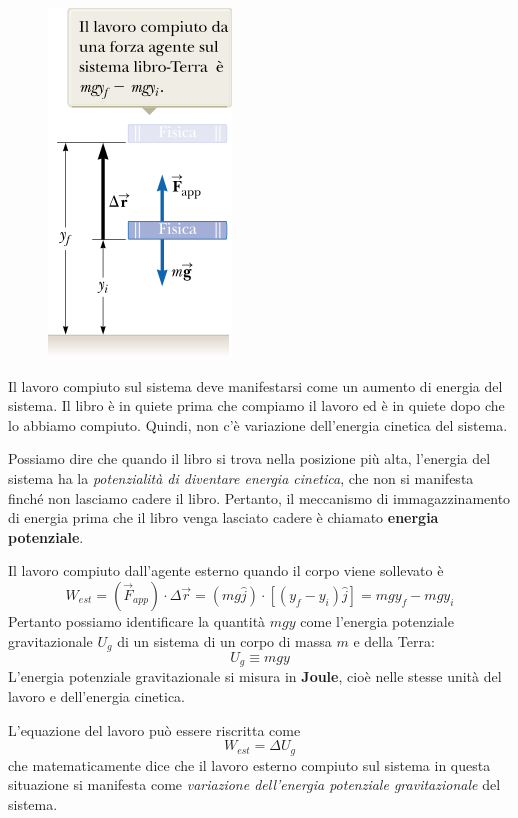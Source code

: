 \documentclass[a4paper,11pt,oneside]{book}
\begin{document}
\begin{figure}[h]
    \centering
    \includegraphics[scale=0.4]{energia_potenziale_schema.png}
\end{figure}
Il lavoro compiuto sul sistema deve manifestarsi come un aumento di energia del sistema. Il libro è in quiete prima che compiamo il lavoro ed è in quiete dopo che lo abbiamo compiuto. Quindi, non c’è variazione dell’energia cinetica del sistema.

Possiamo dire che quando il libro si trova nella posizione più alta, l’energia del sistema ha la \emph{potenzialità di diventare energia cinetica}, che non si manifesta finché non lasciamo cadere il libro. Pertanto, il meccanismo di immagazzinamento di energia prima che il libro venga lasciato cadere è chiamato \textbf{energia potenziale}.

Il lavoro compiuto dall'agente esterno quando il corpo viene sollevato è
\begin{equation*}
    W_{est} = (\vec{F}_{app})\cdot \Delta \vec{r} = (mg\hat{j})\cdot[(y_f-y_i)\hat{j}] = mgy_f-mgy_i
\end{equation*}
Pertanto possiamo identificare la quantità $mgy$ come l’energia potenziale gravitazionale $U_g$ di un sistema di un corpo di massa $m$ e della Terra:
\begin{equation*}
    U_g \equiv mgy
\end{equation*}
L’energia potenziale gravitazionale si misura in \textbf{Joule}, cioè nelle stesse unità del lavoro e dell’energia cinetica.

L'equazione del lavoro può essere riscritta come
\begin{equation*}
    W_{est} = \Delta U_g
\end{equation*}
che matematicamente dice che il lavoro esterno compiuto sul sistema in questa situazione si manifesta come \emph{variazione dell’energia potenziale gravitazionale} del sistema.
\end{document}
